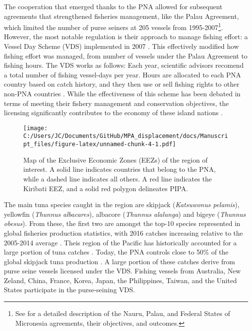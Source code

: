 \documentclass[11pt,]{article}
\let\rmarkdownfootnote\footnote%
\def\footnote{\protect\rmarkdownfootnote}
\begin{document}
The cooperation that emerged thanks to the PNA allowed for subsequent
agreements that strengthened fisheries management, like the Palau
Agreement, which limited the number of purse seiners at 205 vessels from
1995-2007\footnote{See \citet{havice_2010} for a detailed description of
  the Nauru, Palau, and Federal States of Micronesia agreements, their
  objectives, and outcomes.}. However, the most notable regulation is
their approach to manage fishing effort: a Vessel Day Scheme (VDS)
implemented in 2007 \citep{havice_2013}. This effectively modified how
fishing effort was managed, from number of vessels under the Palau
Agreement to fishing hours. The VDS works as follows: Each year,
scientific advisors recomend a total number of fishing vessel-days per
year. Hours are allocated to each PNA country based on catch history,
and they then use or sell fishing rights to other non-PNA countries
\citep{aqorau_2018}. While the effectiveness of this scheme has been
debated in terms of meeting their fishery management and conservation
objectives, the licensing significantly contributes to the economy of
these island nations \citep{havice_2010}.

\begin{figure}
\centering
\texttt{[image: C:/Users/JC/Documents/GitHub/MPA\_displacement/docs/Manuscript\_files/figure-latex/unnamed-chunk-4-1.pdf]}
\caption{\label{fig:unnamed-chunk-4}\label{fig:PNA_map}Map of the Exclusive
Economic Zones (EEZs) of the region of interest. A solid line indicates
countries that belong to the PNA, while a dashed line indicates all
others. A red line indicates the Kiribati EEZ, and a solid red polygon
delineates PIPA.}
\end{figure}

The main tuna species caught in the region are skipjack
(\emph{Katsuwonus pelamis}), yellowfin (\emph{Thunnus albacares}),
albacore (\emph{Thunnus alalunga}) and bigeye (\emph{Thunnus obesus}).
From these, the first two are amongst the top-10 species represented in
global fisheries production statistics, with 2016 catches increasing
relative to the 2005-2014 average \citep{fao_2018}. Theis region of the
Pacific has historically accounted for a large portion of tuna catches
\citep{aqorau_1997}. Today, the PNA controls close to 50\% of the global
skipjack tuna production \citep{pna_website_2018}. A large portion of
these catches derive from purse seine vessels licensed under the VDS.
Fishing vessels from Australia, New Zeland, China, France, Korea, Japan,
the Philippines, Taiwan, and the United States participate in the
purse-seining VDS.
\end{document}
